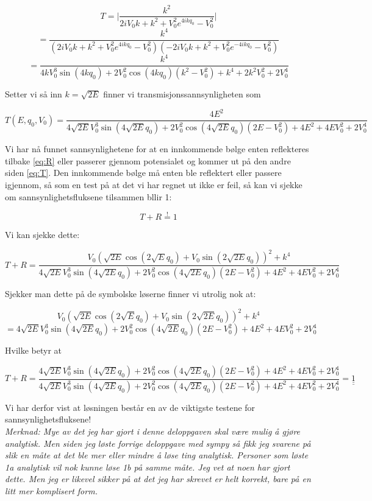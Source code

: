 \documentclass[a4paper,norsk, 10pt]{article}
\numberwithin{equation}{section}
\begin{document}
$$
T = \bigg|\frac{k^2}{2iV_0k + k^2 +V_0^2e^{4ikq_0} - V_0^2}\bigg| 
$$
$$
= \frac{k^4}{(2iV_0k + k^2 +V_0^2e^{4ikq_0} - V_0^2)(-2iV_0k + k^2 +V_0^2e^{-4ikq_0} - V_0^2)}
$$
$$
 = \frac{k^4}{4kV_0^3\sin(4kq_0) + 2V_0^2\cos(4kq_0)(k^2 - V_0^2)+k^4 +2k^2V_0^2 + 2V_0^4}
$$

Setter vi så inn $k = \sqrt{2E}$ finner vi transmisjonssannsynligheten som

\begin{equation}
T(E,q_0,V_0) = \frac{4E^2}{4\sqrt{2E}V_0^3\sin(4\sqrt{2E} q_0) + 2V_0^2\cos(4\sqrt{2E} q_0)(2E - V_0^2)+4E^2 +4EV_0^2 + 2V_0^4}
\label{eq:T}
\end{equation} 

Vi har nå funnet sannsynlighetene for at en innkommende bølge enten reflekteres tilbake \eqref{eq:R} eller passerer gjennom potensialet og kommer ut på den andre siden \eqref{eq:T}. Den innkommende bølge må enten ble reflektert eller passere igjennom, så som en test på at det vi har regnet ut ikke er feil, så kan vi sjekke om sannsynlighetsfluksene tilsammen bllir 1:

$$
T + R \overset{!}{=} 1
$$


Vi kan sjekke dette:

$$
T + R = \frac{V_0\left(\sqrt{2E}\cos(2\sqrt{E}q_0) + V_0\sin(2\sqrt{2E} q_0)\right)^2 + k^4}{4\sqrt{2E}V_0^3\sin(4\sqrt{2E} q_0) + 2V_0^2\cos(4\sqrt{2E} q_0)(2E - V_0^2)+4E^2 +4EV_0^2 + 2V_0^4}
$$

Sjekker man dette på de symbolske løserne finner vi utrolig nok at:

$$
V_0\left(\sqrt{2E}\cos(2\sqrt{E}q_0) + V_0\sin(2\sqrt{2E} q_0)\right)^2 + k^4
$$
$$
= 4\sqrt{2E}V_0^3\sin(4\sqrt{2E} q_0) + 2V_0^2\cos(4\sqrt{2E} q_0)(2E - V_0^2)+4E^2 +4EV_0^2 + 2V_0^4
$$

Hvilke betyr at

$$
T + R = \frac{4\sqrt{2E}V_0^3\sin(4\sqrt{2E} q_0) + 2V_0^2\cos(4\sqrt{2E} q_0)(2E - V_0^2)+4E^2 +4EV_0^2 + 2V_0^4}{4\sqrt{2E}V_0^3\sin(4\sqrt{2E} q_0) + 2V_0^2\cos(4\sqrt{2E} q_0)(2E - V_0^2)+4E^2 +4EV_0^2 + 2V_0^4} = \underline{\underline{1}}
$$

Vi har derfor vist at løsningen består en av de viktigste testene for sannsynlighetsfluksene!\\

\textit{Merknad: Mye av det jeg har gjort i denne deloppgaven skal være mulig å gjøre analytisk. Men siden jeg løste forrige deloppgave med sympy så fikk jeg svarene på slik en måte at det ble mer eller mindre å løse ting analytisk. Personer som løste 1a analytisk vil nok kunne løse 1b på samme måte. Jeg vet at noen har gjort dette. Men jeg er likevel sikker på at det jeg har skrevet er helt korrekt, bare på en litt mer komplisert form.}
\end{document}
